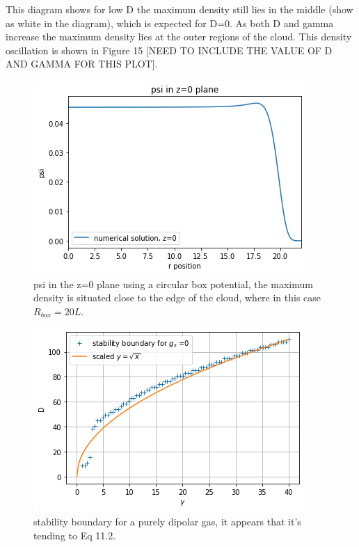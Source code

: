 \documentclass[10pt]{article}
\numberwithin{equation}{section}
\begin{document}
\begin{multicols}{2}
This diagram shows for low D the maximum density still lies in the middle (show as white in the diagram), which is expected for D=0. As both D and gamma increase the maximum density lies at the outer regions of the cloud. This density oscillation is shown in Figure 15 [NEED TO INCLUDE THE VALUE OF D AND GAMMA FOR THIS PLOT]. 
\begin{figure}[H]
\centering
\includegraphics[width=\linewidth]{density oscillation}
\caption{psi in the z=0 plane using a circular box potential, the maximum density is situated close to the edge of the cloud, where in this case $R_{box}=20L$.}
\end{figure}
\begin{figure}[H]
\centering
\includegraphics[width=\linewidth]{purely dipolar with scaled fit}
\caption{stability boundary for a purely dipolar gas, it appears that it's tending to Eq 11.2.}
\end{figure}


\end{multicols}
\end{document}
